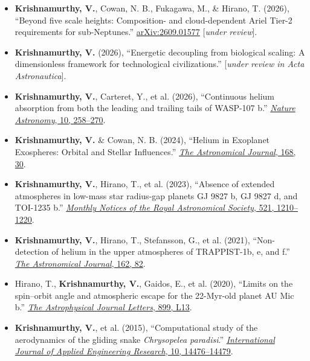 \documentclass[10pt,a4paper]{article}
\begin{document}
\begin{itemize}

\item
\textbf{Krishnamurthy, V.}, Cowan, N. B., Fukagawa, M., \& Hirano, T. (2026),
``Beyond five scale heights: Composition- and cloud-dependent Ariel Tier-2
requirements for sub-Neptunes.''
\href{https://arxiv.org/abs/2609.01577}{arXiv:2609.01577}
[\emph{under review}].

\item
\textbf{Krishnamurthy, V.} (2026),
``Energetic decoupling from biological scaling: A dimensionless framework
for technological civilizations.''
[\emph{under review in Acta Astronautica}].

\item
\textbf{Krishnamurthy, V.}, Carteret, Y., et al. (2026),
``Continuous helium absorption from both the leading and trailing tails of WASP-107 b.''
\href{https://doi.org/10.1038/s41550-025-02710-8}
{\emph{Nature Astronomy}, 10, 258--270}.

\item
\textbf{Krishnamurthy, V.} \& Cowan, N. B. (2024),
``Helium in Exoplanet Exospheres: Orbital and Stellar Influences.''
\href{https://doi.org/10.3847/1538-3881/ad5441}
{\emph{The Astronomical Journal}, 168, 30}.

\item
\textbf{Krishnamurthy, V.}, Hirano, T., et al. (2023),
``Absence of extended atmospheres in low-mass star radius-gap planets GJ 9827 b, GJ 9827 d, and TOI-1235 b.''
\href{https://doi.org/10.1093/mnras/stad404}
{\emph{Monthly Notices of the Royal Astronomical Society}, 521, 1210--1220}.

\item
\textbf{Krishnamurthy, V.}, Hirano, T., Stefansson, G., et al. (2021),
``Non-detection of helium in the upper atmospheres of TRAPPIST-1b, e, and f.''
\href{https://doi.org/10.3847/1538-3881/ac0d57}
{\emph{The Astronomical Journal}, 162, 82}.

\item
Hirano, T., \textbf{Krishnamurthy, V.}, Gaidos, E., et al. (2020),
``Limits on the spin--orbit angle and atmospheric escape for the
22-Myr-old planet AU Mic b.''
\href{https://doi.org/10.3847/2041-8213/aba6eb}
{\emph{The Astrophysical Journal Letters}, 899, L13}.

\item
\textbf{Krishnamurthy, V.}, et al. (2015),
``Computational study of the aerodynamics of the gliding snake
\textit{Chrysopelea paradisi}.''
\href{https://www.academia.edu/69469489/Computational_study_of_the_aerodynamics_of_the_gliding_snake_Chrysopelea_Paradisi}
{\emph{International Journal of Applied Engineering Research},
10, 14476--14479}.

\end{itemize}
\end{document}
